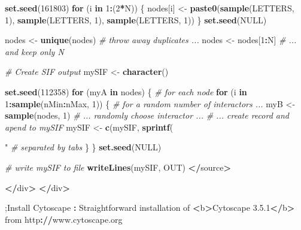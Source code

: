 \documentclass[]{book}
\newenvironment{Shaded}{\begin{snugshade}}{\end{snugshade}}
\newcommand{\KeywordTok}[1]{\textcolor[rgb]{0.13,0.29,0.53}{\textbf{#1}}}
\newcommand{\DecValTok}[1]{\textcolor[rgb]{0.00,0.00,0.81}{#1}}
\newcommand{\FloatTok}[1]{\textcolor[rgb]{0.00,0.00,0.81}{#1}}
\newcommand{\CharTok}[1]{\textcolor[rgb]{0.31,0.60,0.02}{#1}}
\newcommand{\StringTok}[1]{\textcolor[rgb]{0.31,0.60,0.02}{#1}}
\newcommand{\CommentTok}[1]{\textcolor[rgb]{0.56,0.35,0.01}{\textit{#1}}}
\newcommand{\OtherTok}[1]{\textcolor[rgb]{0.56,0.35,0.01}{#1}}
\newcommand{\ControlFlowTok}[1]{\textcolor[rgb]{0.13,0.29,0.53}{\textbf{#1}}}
\newcommand{\OperatorTok}[1]{\textcolor[rgb]{0.81,0.36,0.00}{\textbf{#1}}}
\newcommand{\ErrorTok}[1]{\textcolor[rgb]{0.64,0.00,0.00}{\textbf{#1}}}
\newcommand{\NormalTok}[1]{#1}
\begin{document}
\begin{Shaded}
\begin{Highlighting}[]
\KeywordTok{set.seed}\NormalTok{(}\DecValTok{161803}\NormalTok{)}
\ControlFlowTok{for}\NormalTok{ (i }\ControlFlowTok{in} \DecValTok{1}\OperatorTok{:}\NormalTok{(}\DecValTok{2}\OperatorTok{*}\NormalTok{N)) \{}
\NormalTok{  nodes[i] <-}\StringTok{ }\KeywordTok{paste0}\NormalTok{(}\KeywordTok{sample}\NormalTok{(LETTERS, }\DecValTok{1}\NormalTok{),}
                     \KeywordTok{sample}\NormalTok{(LETTERS, }\DecValTok{1}\NormalTok{),}
                     \KeywordTok{sample}\NormalTok{(LETTERS, }\DecValTok{1}\NormalTok{))}
\NormalTok{\}}
\KeywordTok{set.seed}\NormalTok{(}\OtherTok{NULL}\NormalTok{)}

\NormalTok{nodes <-}\StringTok{ }\KeywordTok{unique}\NormalTok{(nodes) }\CommentTok{# throw away duplicates ...}
\NormalTok{nodes <-}\StringTok{ }\NormalTok{nodes[}\DecValTok{1}\OperatorTok{:}\NormalTok{N]    }\CommentTok{# ... and keep only N}

\CommentTok{# Create SIF output}
\NormalTok{mySIF <-}\StringTok{ }\KeywordTok{character}\NormalTok{()}

\KeywordTok{set.seed}\NormalTok{(}\DecValTok{112358}\NormalTok{)}
\ControlFlowTok{for}\NormalTok{ (myA }\ControlFlowTok{in}\NormalTok{ nodes) \{  }\CommentTok{# for each node}
  \ControlFlowTok{for}\NormalTok{ (i }\ControlFlowTok{in} \DecValTok{1}\OperatorTok{:}\KeywordTok{sample}\NormalTok{(nMin}\OperatorTok{:}\NormalTok{nMax, }\DecValTok{1}\NormalTok{)) \{ }\CommentTok{# for a random number of interactors ...}
\NormalTok{    myB <-}\StringTok{ }\KeywordTok{sample}\NormalTok{(nodes, }\DecValTok{1}\NormalTok{)           }\CommentTok{# ... randomly choose interactor ...}
                                      \CommentTok{# ... create record and apend to mySIF}
\NormalTok{    mySIF <-}\StringTok{ }\KeywordTok{c}\NormalTok{(mySIF, }\KeywordTok{sprintf}\NormalTok{(}\StringTok{"%
                                                       \CommentTok{# separated by tabs}
\NormalTok{  \}}
\NormalTok{\}}
\KeywordTok{set.seed}\NormalTok{(}\OtherTok{NULL}\NormalTok{)}

\CommentTok{# write mySIF to file}
\KeywordTok{writeLines}\NormalTok{(mySIF, OUT)}
\OperatorTok{<}\ErrorTok{/}\NormalTok{source}\OperatorTok{>}

\ErrorTok{</}\NormalTok{div}\OperatorTok{>}
\StringTok{  }\ErrorTok{</}\NormalTok{div}\OperatorTok{>}

\NormalTok{;Install Cytoscape}
\OperatorTok{:}\StringTok{ }\NormalTok{Straightforward installation of }\OperatorTok{<}\NormalTok{b}\OperatorTok{>}\NormalTok{Cytoscape }\FloatTok{3.5}\NormalTok{.}\DecValTok{1}\OperatorTok{<}\ErrorTok{/}\NormalTok{b}\OperatorTok{>}\StringTok{ }\NormalTok{from http}\OperatorTok{:}\ErrorTok{//}\NormalTok{www.cytoscape.org}

}
\end{Highlighting}
\end{Shaded}
\end{document}
